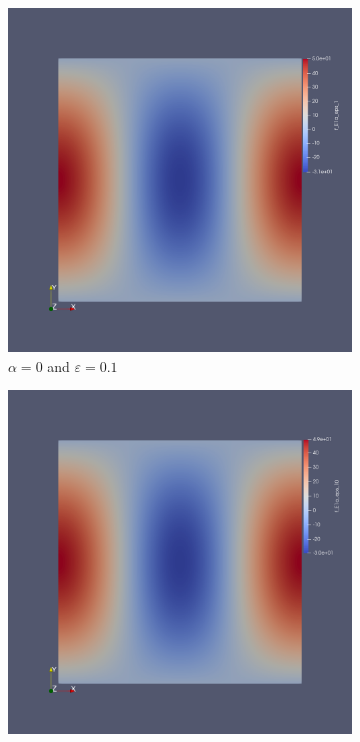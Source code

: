 \documentclass[12pt,a4paper]{article}
\begin{document}
\begin{figure}[H]
 \begin{subfigure}{0.44\textwidth}
     \includegraphics[width=\textwidth]{Pics/uf/F_E1a_eps1.png}
     \caption{$\alpha=0$ and $\varepsilon = 0.1$}
 \end{subfigure}
   \begin{subfigure}{0.44\textwidth}
     \includegraphics[width=\textwidth]{Pics/uf/F_E1a_eps10.png}

\end{subfigure}
\end{figure}
\end{document}

